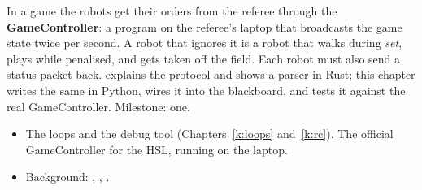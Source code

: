 \label{k:gc}

In a game the robots get their orders from the referee through the \textbf{GameController}: a program on the referee's laptop that broadcasts the game state twice per second. A robot that ignores it is a robot that walks during \emph{set}, plays while penalised, and gets taken off the field. Each robot must also send a status packet back.  explains the protocol and shows a parser in Rust; this chapter writes the same in Python, wires it into the blackboard, and tests it against the real GameController. Milestone: one.

\begin{needbox}
\begin{itemize}[nosep]
  \item The loops and the debug tool (Chapters~\ref{k:loops} and~\ref{k:rc}). The official GameController for the HSL, running on the laptop.
  \item Background: , , .
\end{itemize}
\end{needbox}

